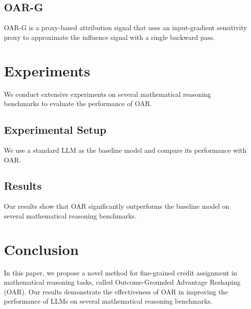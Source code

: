 \documentclass{article}
\begin{document}
        \subsection{OAR-G}
        \label{subsec:oar-g}
        OAR-G is a proxy-based attribution signal that uses an input-gradient sensitivity proxy to approximate the influence signal with a single backward pass.
        
        \section{Experiments}
        \label{sec:experiments}
        We conduct extensive experiments on several mathematical reasoning benchmarks to evaluate the performance of OAR.
        
        \subsection{Experimental Setup}
        \label{subsec:experimental_setup}
        We use a standard LLM as the baseline model and compare its performance with OAR.
        
        \subsection{Results}
        \label{subsec:results}
        Our results show that OAR significantly outperforms the baseline model on several mathematical reasoning benchmarks.
        
        \section{Conclusion}
        \label{sec:conclusion}
        In this paper, we propose a novel method for fine-grained credit assignment in mathematical reasoning tasks, called Outcome-Grounded Advantage Reshaping (OAR). Our results demonstrate the effectiveness of OAR in improving the performance of LLMs on several mathematical reasoning benchmarks.
        
\end{document}
